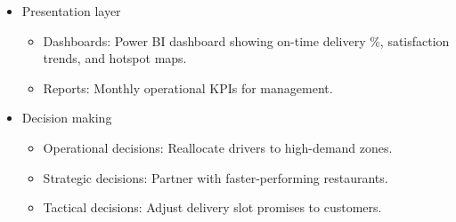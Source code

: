 \begin{itemize}
\begin{itemize}
            \item Apply OLAP operations:
                \begin{itemize}
                    \item Slice data by delivery zone.
                    \item Drill down into high-delay regions.
                    \item Roll up to see weekly averages.
                \end{itemize}
            \item Use predictive analytics to forecast delivery delays.
        \end{itemize}
    \item Presentation layer
    \begin{itemize}
        \item Dashboards: Power BI dashboard showing on-time delivery \%, satisfaction trends, and hotspot maps.
        \item Reports: Monthly operational KPIs for management.
    \end{itemize}
    \item Decision making
    \begin{itemize}
        \item Operational decisions: Reallocate drivers to high-demand zones.
        \item Strategic decisions: Partner with faster-performing restaurants.
        \item Tactical decisions: Adjust delivery slot promises to customers.
    \end{itemize}
\end{itemize}